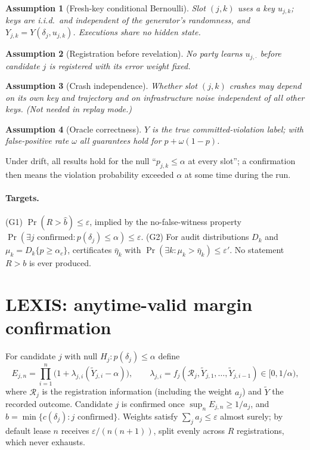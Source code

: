 \documentclass[11pt]{article}
\newtheorem{assumption}{Assumption}
\theoremstyle{definition}
\theoremstyle{remark}
\newcommand{\Prob}{\Pr}
\newcommand{\bhat}{\hat b}
\begin{document}
\begin{assumption}[Fresh-key conditional Bernoulli]\label{as:a1}
Slot $(j,k)$ uses a key $u_{j,k}$; keys are i.i.d.\ and independent of the generator's randomness, and $Y_{j,k}=Y(\delta_j,u_{j,k})$. Executions share no hidden state.
\end{assumption}
\begin{assumption}[Registration before revelation]\label{as:a2} No party learns $u_{j,\cdot}$ before candidate $j$ is registered with its error weight fixed.\end{assumption}
\begin{assumption}[Crash independence]\label{as:a4} Whether slot $(j,k)$ crashes may depend on its own key and trajectory and on infrastructure noise independent of all other keys. (Not needed in replay mode.)\end{assumption}
\begin{assumption}[Oracle correctness]\label{as:a5} $Y$ is the true committed-violation label; with false-positive rate $\omega$ all guarantees hold for $p+\omega(1-p)$.\end{assumption}

Under drift, all results hold for the null ``$p_{j,k}\le\alpha$ at every slot''; a confirmation then means the violation probability exceeded $\alpha$ at some time during the run.

\paragraph{Targets.} (G1) $\Prob(R>\bhat)\le\varepsilon$, implied by the no-false-witness property $\Prob(\exists j\text{ confirmed}: p(\delta_j)\le\alpha)\le\varepsilon$. (G2) For audit distributions $D_k$ and $\mu_k=D_k\{p\ge\alpha_c\}$, certificates $\bar\eta_k$ with $\Prob(\exists k:\mu_k>\bar\eta_k)\le\varepsilon'$. No statement $R>b$ is ever produced.

\section{LEXIS: anytime-valid margin confirmation}\label{sec:lexis}

For candidate $j$ with null $H_j:p(\delta_j)\le\alpha$ define
\begin{equation}
E_{j,n}=\prod_{i=1}^{n}\bigl(1+\lambda_{j,i}(\tilde Y_{j,i}-\alpha)\bigr),\qquad \lambda_{j,i}=f_j(\mathcal R_j,\tilde Y_{j,1},\dots,\tilde Y_{j,i-1})\in[0,1/\alpha),\label{eq:eproc}
\end{equation}
where $\mathcal R_j$ is the registration information (including the weight $a_j$) and $\tilde Y$ the recorded outcome. Candidate $j$ is confirmed once $\sup_n E_{j,n}\ge 1/a_j$, and $\bhat=\min\{c(\delta_j): j\text{ confirmed}\}$. Weights satisfy $\sum_j a_j\le\varepsilon$ almost surely; by default lease $n$ receives $\varepsilon/(n(n+1))$, split evenly across $R$ registrations, which never exhausts.
\end{document}
